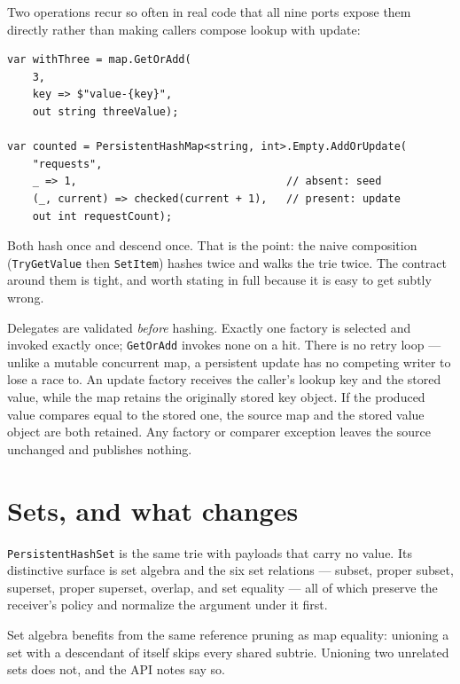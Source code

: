 \documentclass[11pt,twoside,openright]{book}
\newcommand{\code}[1]{\texorpdfstring{\textcolor{d7ink}{\texttt{#1}}}{#1}}
\begin{document}
Two operations recur so often in real code that all nine ports expose them
directly rather than making callers compose lookup with update:

\begin{lstlisting}[language={[Sharp]C}]
var withThree = map.GetOrAdd(
    3,
    key => $"value-{key}",
    out string threeValue);

var counted = PersistentHashMap<string, int>.Empty.AddOrUpdate(
    "requests",
    _ => 1,                                 // absent: seed
    (_, current) => checked(current + 1),   // present: update
    out int requestCount);
\end{lstlisting}

Both hash once and descend once. That is the point: the naive composition
(\code{TryGetValue} then \code{SetItem}) hashes twice and walks the trie twice.
The contract around them is tight, and worth stating in full because it is easy
to get subtly wrong.

\begin{contractbox}
Delegates are validated \emph{before} hashing. Exactly one factory is selected
and invoked exactly once; \code{GetOrAdd} invokes none on a hit. There is no
retry loop --- unlike a mutable concurrent map, a persistent update has no
competing writer to lose a race to. An update factory receives the caller's
lookup key and the stored value, while the map retains the originally stored key
object. If the produced value compares equal to the stored one, the source map
and the stored value object are both retained. Any factory or comparer exception
leaves the source unchanged and publishes nothing.
\end{contractbox}

\section{Sets, and what changes}

\code{PersistentHashSet} is the same trie with payloads that carry no value. Its
distinctive surface is set algebra and the six set relations --- subset, proper
subset, superset, proper superset, overlap, and set equality --- all of which
preserve the receiver's policy and normalize the argument under it first.

Set algebra benefits from the same reference pruning as map equality: unioning a
set with a descendant of itself skips every shared subtrie. Unioning two
unrelated sets does not, and the API notes say so.
\end{document}
